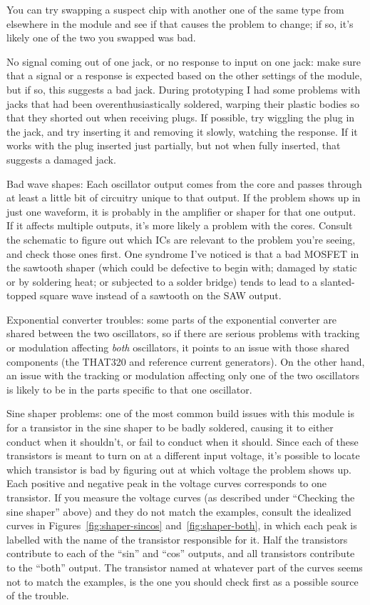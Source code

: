 You can try swapping a suspect chip with another one of the same type from
elsewhere in the module and see if that causes the problem to change; if so,
it's likely one of the two you swapped was bad.

No signal coming out of one jack, or no response to
input on one jack:  make sure that a signal or a response is expected based
on the other settings of the module, but if so, this suggests a bad jack. 
During prototyping I had some problems with jacks that had been
overenthusiastically soldered, warping their plastic bodies so that they
shorted out when receiving plugs.  If possible, try wiggling the plug in the
jack, and try inserting it and removing it slowly, watching the response. 
If it works with the plug inserted just partially, but not when fully
inserted, that suggests a damaged jack.

Bad wave shapes:  Each oscillator output comes from the core and passes
through at least a little bit of circuitry unique to that output.  If the
problem shows up in just one waveform, it is probably in the amplifier or
shaper for that one output.  If it affects multiple outputs, it's more
likely a problem with the cores.  Consult the schematic to figure out which
ICs are relevant to the problem you're seeing, and check those ones first. 
One syndrome I've noticed is that a bad MOSFET in the sawtooth shaper
(which could be defective to begin with; damaged by static or by soldering
heat; or subjected to a solder bridge) tends to lead to a slanted-topped
square wave instead of a sawtooth on the SAW output.

Exponential converter troubles:  some parts of the exponential converter are
shared between the two oscillators, so if there are serious problems with
tracking or modulation affecting \emph{both} oscillators, it points to an
issue with those shared components (the THAT320 and reference current
generators).  On the other hand, an issue with the tracking or modulation
affecting only one of the two oscillators is likely to be in the parts
specific to that one oscillator.

Sine shaper problems:  one of the most common build issues with this module
is for a transistor in the sine shaper to be badly soldered, causing it to
either conduct when it shouldn't, or fail to conduct when it should.  Since
each of these transistors is meant to turn on at a different input voltage,
it's possible to locate which transistor is bad by figuring out at which
voltage the problem shows up.  Each positive and negative peak in the
voltage curves corresponds to one transistor.  If you measure the voltage
curves (as described under ``Checking the sine shaper'' above) and they do
not match the examples, consult the idealized curves in
Figures~\ref{fig:shaper-sincos} and~\ref{fig:shaper-both}, in which each
peak is labelled with the name of the transistor responsible for it.  Half
the transistors contribute to each of the ``sin'' and ``cos'' outputs, and
all transistors contribute to the ``both'' output.  The transistor named at
whatever part of the curves seems not to match the examples, is the one you
should check first as a possible source of the trouble.

